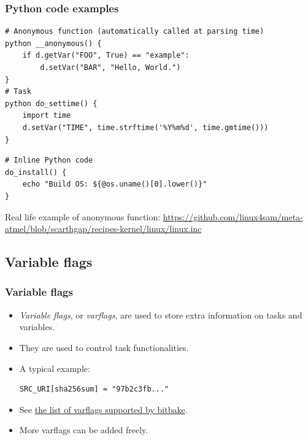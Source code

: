 \begin{frame}[fragile]
  \frametitle{Python code examples}
  \small
  \begin{verbatim}
# Anonymous function (automatically called at parsing time)
python __anonymous() {
    if d.getVar("FOO", True) == "example":
        d.setVar("BAR", "Hello, World.")
}
# Task
python do_settime() {
    import time
    d.setVar("TIME", time.strftime('%Y%m%d', time.gmtime()))
}
  \end{verbatim}
  \begin{verbatim}
# Inline Python code
do_install() {
    echo "Build OS: ${@os.uname()[0].lower()}"
}
  \end{verbatim}
Real life example of anonymous function:
\footnotesize
\url{https://github.com/linux4sam/meta-atmel/blob/scarthgap/recipes-kernel/linux/linux.inc}
\end{frame}

\subsection{Variable flags}

\begin{frame}[fragile]
  \frametitle{Variable flags}
  \begin{itemize}
    \item {\em Variable flags}, or {\em varflags}, are used to store extra
      information on tasks and variables.
    \item They are used to control task functionalities.
    \item A typical example:
  \begin{verbatim}
SRC_URI[sha256sum] = "97b2c3fb..."
  \end{verbatim}
  \item See
    \href{https://docs.yoctoproject.org/bitbake/bitbake-user-manual/bitbake-user-manual-metadata.html#variable-flags}{the list of varflags supported by bitbake}.
  \item More varflags can be added freely.
  \end{itemize}
\end{frame}

